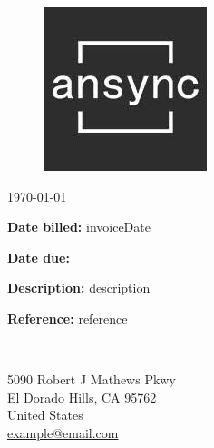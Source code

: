 \begin{figure}
	\hspace{15cm}
	\includegraphics[scale=0.35]{ansync_logo.jpg}
	\vspace{-20mm}
\end{figure}
 {\today} %


\outputinvoicenum %

\begin{minipage}[t]{0.5\textwidth}
	\textbf{Date billed:} {{invoiceDate}}
	
	\textbf{Date due:}  %
	
	\textbf{Description:} {{description}}
	
	\textbf{Reference:} {{reference}}
\end{minipage}
\begin{minipage}[t]{0.15\textwidth}
	~ %
\end{minipage}
\begin{minipage}[t]{0.35\textwidth}
	
	5090 Robert J Mathews Pkwy\\ %
	El Dorado Hills, CA 95762 \\
	United States \\
	\href{mailto:example@email.com}{example@email.com} %
\end{minipage}

